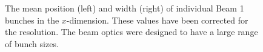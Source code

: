 \begin{figure}[!h]
\begin{subfigure}[m]{0.49\textwidth}
    \end{subfigure}
    \caption{The mean position (left) and width (right) of individual Beam 1 bunches in the $x$-dimension. These values have been corrected for the \velo resolution. The beam optics were designed to have a large range of bunch sizes.}
    \label{fig:Dec_bgi_fill}   
\end{figure}



